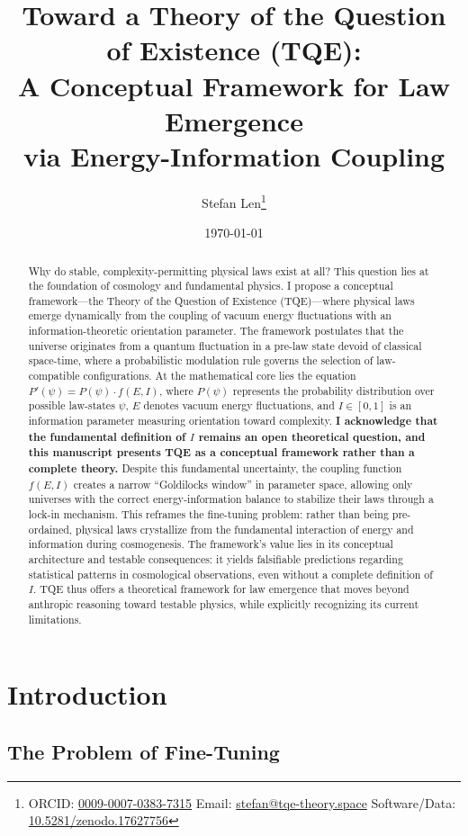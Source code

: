 \documentclass[12pt,a4paper]{article}
\title{Toward a Theory of the Question of Existence (TQE):\\ A Conceptual Framework for Law Emergence\\ via Energy-Information Coupling}
\author{Stefan Len\footnote{ORCID: \href{https://orcid.org/0009-0007-0383-7315}{0009-0007-0383-7315} \quad Email: \href{mailto:stefan@tqe-theory.space}{stefan@tqe-theory.space} \quad Software/Data: \href{https://doi.org/10.5281/zenodo.17627756}{10.5281/zenodo.17627756}}}
\date{\today}
\theoremstyle{definition}
\theoremstyle{remark}
\begin{document}
\maketitle

\begin{abstract}
Why do stable, complexity-permitting physical laws exist at all? This question lies at the foundation of cosmology and fundamental physics. I propose a conceptual framework—the Theory of the Question of Existence (TQE)—where physical laws emerge dynamically from the coupling of vacuum energy fluctuations with an information-theoretic orientation parameter. The framework postulates that the universe originates from a quantum fluctuation in a pre-law state devoid of classical space-time, where a probabilistic modulation rule governs the selection of law-compatible configurations. At the mathematical core lies the equation $P'(\psi) = P(\psi) \cdot f(E,I)$, where $P(\psi)$ represents the probability distribution over possible law-states $\psi$, $E$ denotes vacuum energy fluctuations, and $I \in [0,1]$ is an information parameter measuring orientation toward complexity. \textbf{I acknowledge that the fundamental definition of $I$ remains an open theoretical question, and this manuscript presents TQE as a conceptual framework rather than a complete theory.} Despite this fundamental uncertainty, the coupling function $f(E,I)$ creates a narrow ``Goldilocks window'' in parameter space, allowing only universes with the correct energy-information balance to stabilize their laws through a lock-in mechanism. This reframes the fine-tuning problem: rather than being pre-ordained, physical laws crystallize from the fundamental interaction of energy and information during cosmogenesis. The framework's value lies in its conceptual architecture and testable consequences: it yields falsifiable predictions regarding statistical patterns in cosmological observations, even without a complete definition of $I$. TQE thus offers a theoretical framework for law emergence that moves beyond anthropic reasoning toward testable physics, while explicitly recognizing its current limitations.
\end{abstract}

\section{Introduction}

\subsection{The Problem of Fine-Tuning}
\end{document}

